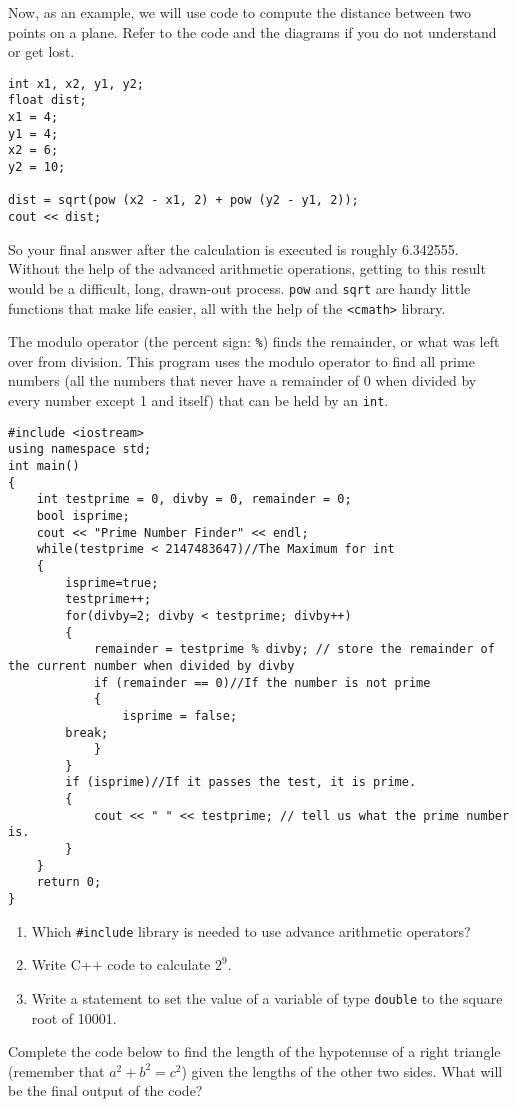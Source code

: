	Now, as an example, we will use code to compute the distance between two points on a plane.
	 Refer to the code and the diagrams if you do not understand or get lost.

\begin{lstlisting}
int x1, x2, y1, y2;
float dist;
x1 = 4;
y1 = 4;
x2 = 6;
y2 = 10;

dist = sqrt(pow (x2 - x1, 2) + pow (y2 - y1, 2));
cout << dist;
\end{lstlisting}
	
	So your final answer after the calculation is executed is roughly 6.342555. 
	Without the help of the advanced arithmetic operations, getting to this result would be a difficult, long, drawn-out process. 
	\texttt{pow} and \texttt{sqrt} are handy little functions that make life easier, all with the help of the \texttt{<cmath>} library.

The modulo operator (the percent sign: \texttt{\%}) finds the remainder, or what was left over from division. 
This program uses the modulo operator to find all prime numbers (all the numbers that never have a remainder of 0 when divided by every number except 1 and itself) that can be held by an \texttt{int}.

\begin{lstlisting}
#include <iostream>
using namespace std;
int main()
{
	int testprime = 0, divby = 0, remainder = 0;
	bool isprime;
	cout << "Prime Number Finder" << endl;
	while(testprime < 2147483647)//The Maximum for int
	{
    	isprime=true;
    	testprime++;
    	for(divby=2; divby < testprime; divby++)
    	{
        	remainder = testprime % divby; // store the remainder of the current number when divided by divby
        	if (remainder == 0)//If the number is not prime
        	{
            	isprime = false;
		break;
        	}
    	}
    	if (isprime)//If it passes the test, it is prime.
    	{
        	cout << " " << testprime; // tell us what the prime number is.
    	}
	}
	return 0;
}
\end{lstlisting}

\begin{enumerate}
\item Which \texttt{\#include} library is needed to use advance arithmetic operators?

\item Write C++ code to calculate $2^9$.

\item Write a statement to set the value of a variable of type \texttt{double} to the square root of 10001.
\end{enumerate}
Complete the code below to find the length of the hypotenuse of a right triangle (remember that $a^2 + b^2 = c^2$) given the lengths of the other two sides. What will be the final output of the code?

